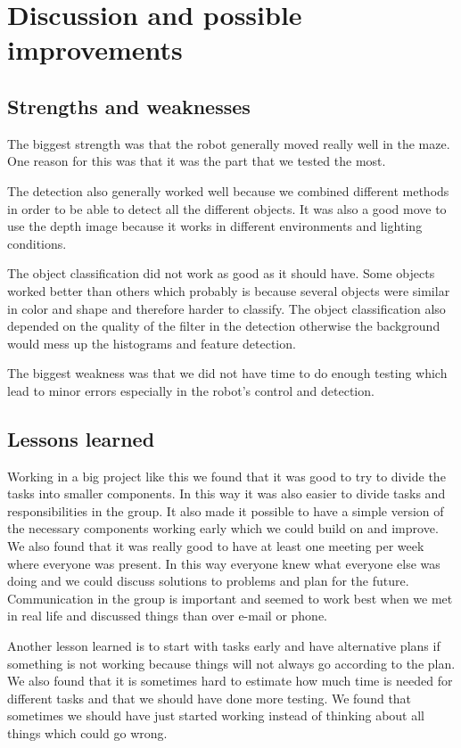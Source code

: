 
\section{Discussion and possible improvements}

\subsection{Strengths and weaknesses}
The biggest strength was that the robot generally moved really well in the maze. One reason for this was that it was the part that we tested the most. 

\bigskip
\noindent The detection also generally worked well because we combined different methods in order to be able to detect all the different objects. It was also a good move to use the depth image because it works in different environments and lighting conditions. 

\bigskip
\noindent The object classification did not work as good as it should have. Some objects worked better than others which probably is because several objects were similar in color and shape and therefore harder to classify. The object classification also depended on the quality of the filter in the detection otherwise the background would mess up the histograms and feature detection. 

\bigskip
\noindent The biggest weakness was that we did not have time to do enough testing which lead to minor errors especially in the robot's control and detection. 


\subsection{Lessons learned}
Working in a big project like this we found that it was good to try to divide the tasks into smaller components. In this way it was also easier to divide tasks and responsibilities in the group. It also made it possible to have a simple version of the necessary components working early which we could build on and improve. We also found that it was really good to have at least one meeting per week where everyone was present. In this way everyone knew what everyone else was doing and we could discuss solutions to problems and plan for the future. Communication in the group is important and seemed to work best when we met in real life and discussed things than over e-mail or phone. 

\bigskip
\noindent Another lesson learned is to start with tasks early and have alternative plans if something is not working because things will not always go according to the plan. We also found that it is sometimes hard to estimate how much time is needed for different tasks and that we should have done more testing. We found that sometimes we should have just started working instead of thinking about all things which could go wrong.


